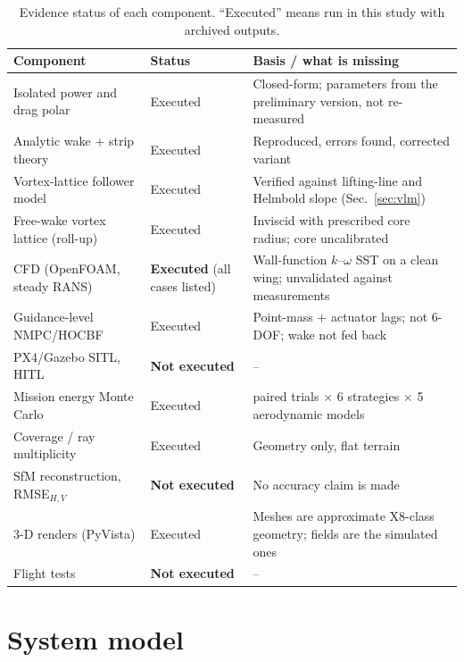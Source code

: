 \documentclass[preprint,12pt]{elsarticle}
\begin{document}
\begin{table}[H]
\centering\small
\caption{Evidence status of each component. ``Executed'' means run in this study with archived outputs.}\label{tab:status}
\begin{tabular}{@{}p{4.0cm}p{2.6cm}p{6.6cm}@{}}
\toprule
Component & Status & Basis / what is missing\\\midrule
Isolated power and drag polar & Executed & Closed-form; parameters from the preliminary version, not re-measured\\
Analytic wake + strip theory & Executed & Reproduced, errors found, corrected variant\\
Vortex-lattice follower model & Executed & Verified against lifting-line and Helmbold slope (Sec.~\ref{sec:vlm})\\
Free-wake vortex lattice (roll-up) & Executed & Inviscid with prescribed core radius; core uncalibrated\\
CFD (OpenFOAM, steady RANS) & \textbf{Executed} (all cases listed) & Wall-function $k$--$\omega$ SST on a clean wing; unvalidated against measurements\\
Guidance-level NMPC/HOCBF & Executed & Point-mass + actuator lags; not 6-DOF; wake not fed back\\
PX4/Gazebo SITL, HITL & \textbf{Not executed} & --\\
Mission energy Monte Carlo & Executed & \nnTrials{} paired trials $\times$ 6 strategies $\times$ 5 aerodynamic models\\
Coverage / ray multiplicity & Executed & Geometry only, flat terrain\\
SfM reconstruction, RMSE$_{H,V}$ & \textbf{Not executed} & No accuracy claim is made\\
3-D renders (PyVista) & Executed & Meshes are approximate X8-class geometry; fields are the simulated ones\\
Flight tests & \textbf{Not executed} & --\\\bottomrule
\end{tabular}
\end{table}



\section{System model}\label{sec:model}
\end{document}
